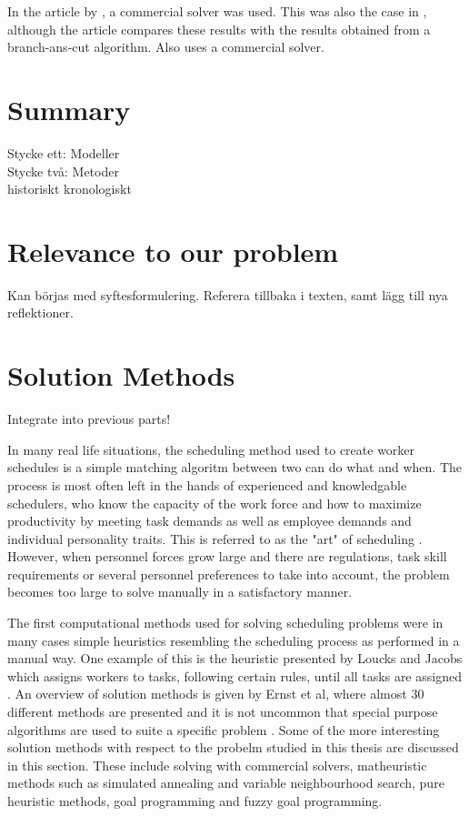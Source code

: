 In the article by \citet{eiselt_2008}, a commercial solver was used. This was also the case in \citet{mohan_2008}, although the article compares these results with the results obtained from a branch-ans-cut algorithm. Also \cite{shahnazari_2013} uses a commercial solver.

\section{Summary}
Stycke ett: Modeller \\
Stycke två: Metoder \\
historiskt kronologiskt

\section{Relevance to our problem}
Kan börjas med syftesformulering. 
Referera tillbaka i texten, samt lägg till nya reflektioner.












\section{Solution Methods}
Integrate into previous parts!


In many real life situations, the scheduling method used to create worker schedules is a simple matching algoritm between two can do what and when. The process is most often left in the hands of experienced and knowledgable schedulers, who know the capacity of the work force and how to maximize productivity by meeting task demands as well as employee demands and individual personality traits. This is referred to as the "art" of scheduling \citet{roberts_1983}. However, when personnel forces grow large and there are regulations, task skill requirements or several personnel preferences to take into account, the problem becomes too large to solve manually in a satisfactory manner.

The first computational methods used for solving scheduling problems were in many cases simple heuristics resembling the scheduling process as performed in a manual way. One example of this is the heuristic presented by Loucks and Jacobs which assigns workers to tasks, following certain rules, until all tasks are assigned \citet{loucks_1991}. An overview of solution methods is given by Ernst et al, where almost 30 different methods are presented  and it is not uncommon that special purpose algorithms are used to suite a specific problem \citet{ernst_2004}. Some of the more interesting solution methods with respect to the probelm studied in this thesis are discussed in this section. These include solving with commercial solvers, matheuristic methods such as simulated annealing and variable neighbourhood search, pure heuristic methods, goal programming and fuzzy goal programming.  


